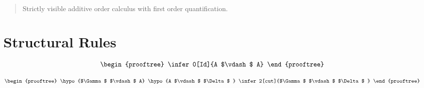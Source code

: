 


\begin{abstract}
Strictly visible additive order calculus with first order quantification.
\end{abstract}

\section{Structural Rules}

\begin{center}
	\[
	\begin{prooftree}
	\infer0[Id]{A $\vdash$  A}
	\end{prooftree}
	\]
	
	\[
	\begin{prooftree}
	\hypo{$\Gamma$  $\vdash$  A}
	\hypo{A $\vdash$  $\Delta$ }
	\infer2[cut]{$\Gamma$  $\vdash$  $\Delta$ }
	\end{prooftree}
	\]
\end{center}

